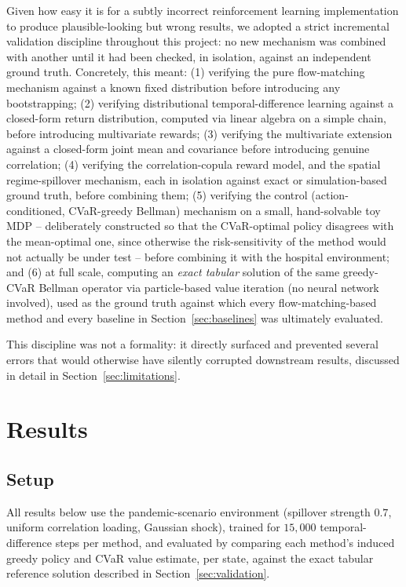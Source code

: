 \documentclass[11pt]{article}
\begin{document}
Given how easy it is for a subtly incorrect reinforcement learning implementation to produce plausible-looking but wrong results, we adopted a strict incremental validation discipline throughout this project: no new mechanism was combined with another until it had been checked, in isolation, against an independent ground truth. Concretely, this meant: (1) verifying the pure flow-matching mechanism against a known fixed distribution before introducing any bootstrapping; (2) verifying distributional temporal-difference learning against a closed-form return distribution, computed via linear algebra on a simple chain, before introducing multivariate rewards; (3) verifying the multivariate extension against a closed-form joint mean and covariance before introducing genuine correlation; (4) verifying the correlation-copula reward model, and the spatial regime-spillover mechanism, each in isolation against exact or simulation-based ground truth, before combining them; (5) verifying the control (action-conditioned, CVaR-greedy Bellman) mechanism on a small, hand-solvable toy MDP -- deliberately constructed so that the CVaR-optimal policy disagrees with the mean-optimal one, since otherwise the risk-sensitivity of the method would not actually be under test -- before combining it with the hospital environment; and (6) at full scale, computing an \emph{exact tabular} solution of the same greedy-CVaR Bellman operator via particle-based value iteration (no neural network involved), used as the ground truth against which every flow-matching-based method and every baseline in Section~\ref{sec:baselines} was ultimately evaluated.

This discipline was not a formality: it directly surfaced and prevented several errors that would otherwise have silently corrupted downstream results, discussed in detail in Section~\ref{sec:limitations}.

\section{Results}
\label{sec:results}

\subsection{Setup}
All results below use the pandemic-scenario environment (spillover strength $0.7$, uniform correlation loading, Gaussian shock), trained for $15{,}000$ temporal-difference steps per method, and evaluated by comparing each method's induced greedy policy and CVaR value estimate, per state, against the exact tabular reference solution described in Section~\ref{sec:validation}.
\end{document}
